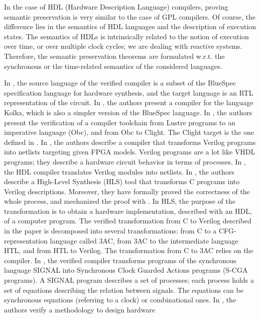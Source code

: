 \documentclass[pdflatex,sn-mathphys]{sn-jnl}%
\theoremstyle{thmstyleone}%
\theoremstyle{thmstyletwo}%
\theoremstyle{thmstylethree}%
\begin{document}
In the case of HDL (Hardware Description Language) compilers, proving
semantic preservation is very similar to the case of GPL compilers. Of
course, the difference lies in the semantics of HDL languages and the
description of execution states. The semantics of HDLs is
intrinsically related to the notion of execution over time, or over
multiple clock cycles; we are dealing with reactive
systems. Therefore, the semantic preservation theorems are formulated
w.r.t. the synchronous or the time-related semantics of the considered
languages.

In \cite{Bourgeat2020,Braibant2013}, the source language of the
verified compiler is a subset of the BlueSpec specification language
for hardware synthesis, and the target language is an RTL
representation of the circuit.  In \cite{Bourgeat2020}, the authors
present a compiler for the language Koîka, which is also a simpler
version of the BlueSpec language.  In \cite{Bourke}, the authors
present the verification of a compiler toolchain from \textsf{Lustre}
programs to an imperative language (Obc), and from Obc to Clight.  The
Clight target is the one defined in \ccert{} \cite{Blazy2006}.  In
\cite{Loow2021}, the authors describe a compiler that transforms
Verilog programs into netlists targeting given FPGA models. Verilog
programs are a lot like VHDL programs; they describe a hardware
circuit behavior in terms of processes.  In \cite{Loow2021}, the HDL
compiler translates Verilog modules into netlists.  In
\cite{Herklotz2021}, the authors describe a High-Level Synthesis (HLS)
tool that transforms C programs into Verilog descriptions. Moreover,
they have formally proved the correctness of the whole process, and
mechanized the proof with \coq{}. In HLS, the purpose of the
transformation is to obtain a hardware implementation, described with
an HDL, of a computer program. The verified transformation from C to
Verilog described in the paper is decomposed into several
transformations: from C to a CFG-representation language called 3AC,
from 3AC to the intermediate language HTL, and from HTL to
Verilog. The transformation from C to 3AC relies on the \ccert{}
compiler.  In \cite{Yang2016}, the verified compiler transforms
programs of the synchronous language SIGNAL into Synchronous Clock
Guarded Actions programs (S-CGA programs). A SIGNAL program describes
a set of processes; each process holds a set of equations describing
the relation between signals. The equations can be synchronous
equations (referring to a clock) or combinational ones.  In
\cite{Habibi2006}, the authors verify a methodology to design hardware
\end{document}
